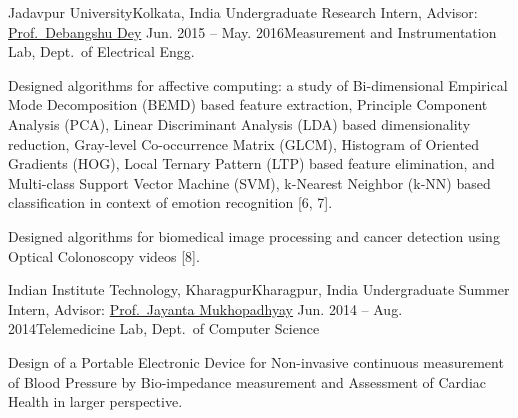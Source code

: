 \documentclass[letterpaper,10pt]{article}
\begin{document}
\resumeSubheading
{Jadavpur University}{Kolkata, India}
{Undergraduate Research Intern, Advisor: 
{\href{https://scholar.google.com/citations?hl=en&user=tlzV8CAAAAAJ&view_op=list_works&sortby=pubdate}{Prof.\ Debangshu Dey}}}
{Jun. 2015 -- May. 2016}{Measurement and Instrumentation Lab, Dept.\ of Electrical Engg.}
\resumeItemListStart
\item {Designed algorithms for affective computing: a study of Bi-dimensional Empirical Mode Decomposition (BEMD) based feature extraction, Principle Component Analysis (PCA), Linear Discriminant Analysis (LDA) based dimensionality reduction, Gray-level Co-occurrence Matrix (GLCM), Histogram of Oriented Gradients (HOG), Local Ternary Pattern (LTP) based feature elimination, and Multi-class Support Vector Machine (SVM), k-Nearest Neighbor (k-NN) based classification in context of emotion recognition [6, 7]}.
\item {Designed algorithms for biomedical image processing and cancer detection using Optical Colonoscopy videos [8]}.
\resumeItemListEnd

\resumeSubheading
{Indian Institute Technology, Kharagpur}{Kharagpur, India}
{Undergraduate Summer Intern, Advisor: \href{http://www.facweb.iitkgp.ac.in/~jay/}{Prof.\ Jayanta Mukhopadhyay}}
{Jun. 2014 -- Aug. 2014}{Telemedicine Lab, Dept.\ of Computer Science}
\resumeItemListStart
\item {Design of a Portable Electronic Device for Non-invasive continuous measurement of Blood Pressure by Bio-impedance measurement and Assessment of Cardiac Health in larger perspective.}
\resumeItemListEnd
\resumeSubHeadingListEnd

\end{document}

